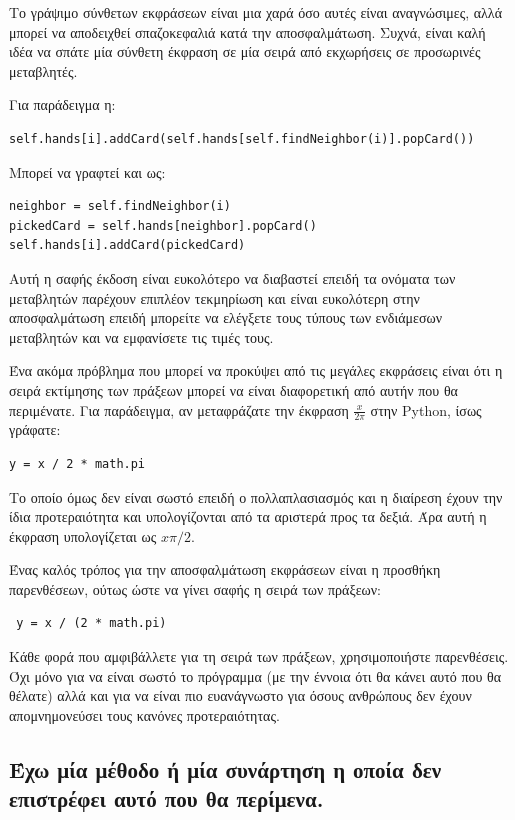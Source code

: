 \documentclass[10pt]{book}
\begin{document}
Το γράψιμο σύνθετων εκφράσεων είναι μια χαρά όσο αυτές είναι αναγνώσιμες, αλλά μπορεί 
να αποδειχθεί σπαζοκεφαλιά κατά την αποσφαλμάτωση. Συχνά, είναι καλή ιδέα να σπάτε
μία σύνθετη έκφραση σε μία σειρά από εκχωρήσεις σε προσωρινές μεταβλητές. 

Για παράδειγμα η:


\begin{verbatim}
self.hands[i].addCard(self.hands[self.findNeighbor(i)].popCard())
\end{verbatim}
%
Μπορεί να γραφτεί και ως:

\begin{verbatim}
neighbor = self.findNeighbor(i)
pickedCard = self.hands[neighbor].popCard()
self.hands[i].addCard(pickedCard)
\end{verbatim}
%
Αυτή η σαφής έκδοση είναι ευκολότερο να διαβαστεί επειδή τα ονόματα των μεταβλητών παρέχουν επιπλέον
τεκμηρίωση και είναι ευκολότερη στην αποσφαλμάτωση επειδή μπορείτε να ελέγξετε τους τύπους των
ενδιάμεσων μεταβλητών και να εμφανίσετε τις τιμές τους.

Ένα ακόμα πρόβλημα που μπορεί να προκύψει από τις μεγάλες εκφράσεις είναι ότι η σειρά εκτίμησης των
πράξεων μπορεί να είναι διαφορετική από αυτήν που θα περιμένατε. Για παράδειγμα, αν μεταφράζατε την
έκφραση $\frac{x}{2 \pi}$ στην Python, ίσως γράφατε:

\begin{verbatim}
y = x / 2 * math.pi
\end{verbatim}
%
Το οποίο όμως δεν είναι σωστό επειδή ο πολλαπλασιασμός και η διαίρεση έχουν την ίδια προτεραιότητα
και υπολογίζονται από τα αριστερά προς τα δεξιά.  Άρα αυτή η έκφραση υπολογίζεται ως $x \pi / 2$.

Ένας καλός τρόπος για την αποσφαλμάτωση εκφράσεων είναι η προσθήκη παρενθέσεων,
ούτως ώστε να γίνει σαφής η σειρά των πράξεων:

\begin{verbatim}
 y = x / (2 * math.pi)
\end{verbatim}
%
Κάθε φορά που αμφιβάλλετε για τη σειρά των πράξεων, χρησιμοποιήστε παρενθέσεις. Όχι μόνο για να
είναι σωστό το πρόγραμμα (με την έννοια ότι θα κάνει αυτό που θα θέλατε) αλλά και για να είναι
πιο ευανάγνωστο για όσους ανθρώπους δεν έχουν απομνημονεύσει τους κανόνες προτεραιότητας.


\subsection{Έχω μία μέθοδο ή μία συνάρτηση η οποία δεν επιστρέφει αυτό που θα περίμενα.}
\end{document}
